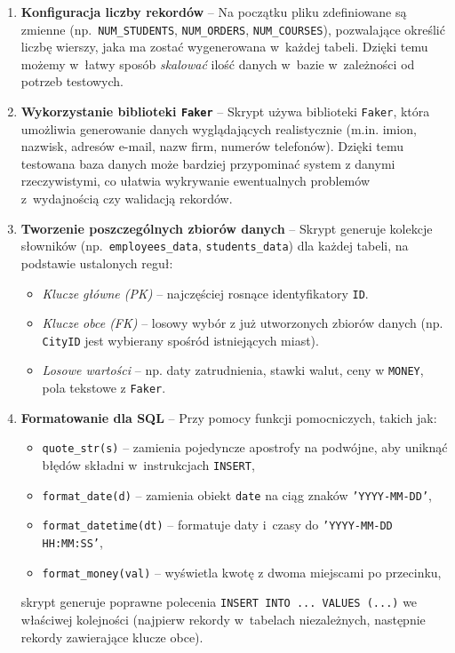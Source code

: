 \documentclass[12pt]{article}
\begin{document}
\begin{enumerate}
    \item \textbf{Konfiguracja liczby rekordów} -- Na początku pliku zdefiniowane są zmienne 
          (np.~\texttt{NUM\_STUDENTS}, \texttt{NUM\_ORDERS}, \texttt{NUM\_COURSES}), 
          pozwalające określić liczbę wierszy, jaka ma zostać wygenerowana w~każdej tabeli. 
          Dzięki temu możemy w~łatwy sposób \emph{skalować} ilość danych w~bazie w~zależności od potrzeb testowych.

    \item \textbf{Wykorzystanie biblioteki \texttt{Faker}} -- Skrypt używa biblioteki \texttt{Faker}, 
          która umożliwia generowanie danych wyglądających realistycznie (m.in. imion, nazwisk, adresów e-mail, 
          nazw firm, numerów telefonów). Dzięki temu testowana baza danych może bardziej przypominać system z danymi rzeczywistymi, 
          co ułatwia wykrywanie ewentualnych problemów z~wydajnością czy walidacją rekordów.

    \item \textbf{Tworzenie poszczególnych zbiorów danych} -- 
          Skrypt generuje kolekcje słowników (np.~\texttt{employees\_data}, \texttt{students\_data}) 
          dla każdej tabeli, na podstawie ustalonych reguł:
          \begin{itemize}
            \item \emph{Klucze główne (PK)} -- najczęściej rosnące identyfikatory \texttt{ID}.
            \item \emph{Klucze obce (FK)} -- losowy wybór z już utworzonych zbiorów danych (np. \texttt{CityID} jest wybierany spośród istniejących miast).
            \item \emph{Losowe wartości} -- np. daty zatrudnienia, stawki walut, ceny w \texttt{MONEY}, pola tekstowe z \texttt{Faker}.
          \end{itemize}

    \item \textbf{Formatowanie dla SQL} -- Przy pomocy funkcji pomocniczych, takich jak:
          \begin{itemize}
              \item \texttt{quote\_str(s)} -- zamienia pojedyncze apostrofy na podwójne, 
                    aby uniknąć błędów składni w~instrukcjach \texttt{INSERT},
              \item \texttt{format\_date(d)} -- zamienia obiekt \texttt{date} na ciąg znaków \texttt{'YYYY-MM-DD'},
              \item \texttt{format\_datetime(dt)} -- formatuje daty i~czasy do \texttt{'YYYY-MM-DD HH:MM:SS'},
              \item \texttt{format\_money(val)} -- wyświetla kwotę z dwoma miejscami po przecinku,
          \end{itemize}
          skrypt generuje poprawne polecenia \texttt{INSERT INTO ... VALUES (...)} we właściwej kolejności (najpierw rekordy w~tabelach niezależnych, następnie rekordy zawierające klucze obce).


\end{enumerate}
\end{document}
